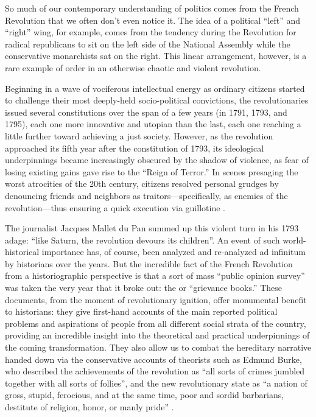So much of our contemporary understanding of politics comes from the French Revolution that we often don't even notice it. The idea of a political ``left'' and ``right'' wing, for example, comes from the tendency during the Revolution for radical republicans to sit on the left side of the National Assembly while the conservative monarchists sat on the right. This linear arrangement, however, is a rare example of order in an otherwise chaotic and violent revolution.

Beginning in a wave of vociferous intellectual energy as ordinary citizens started to challenge their most deeply-held socio-political convictions, the revolutionaries issued several constitutions over the span of a few years (in 1791, 1793, and 1795), each one more innovative and utopian than the last, each one reaching a little further toward achieving a just society. However, as the revolution approached its fifth year after the constitution of 1793, its ideological underpinnings became increasingly obscured by the shadow of violence, as fear of losing existing gains gave rise to the ``Reign of Terror.'' In scenes presaging the worst atrocities of the 20th century, citizens resolved personal grudges by denouncing friends and neighbors as traitors---specifically, as enemies of the revolution---thus ensuring a quick execution via guillotine \citep{furet_interpreting_1978}.

The journalist Jacques Mallet du Pan summed up this violent turn in his 1793 adage: ``like Saturn, the revolution devours its children''. An event of such world-historical importance has, of course, been analyzed and re-analyzed ad infinitum by historians over the years. But the incredible fact of the French Revolution from a historiographic perspective is that a sort of mass ``public opinion survey'' was taken the very year that it broke out: the \cahiers{} or ``grievance books.'' These documents, from the moment of revolutionary ignition, offer monumental benefit to historians: they give first-hand accounts of the main reported political problems and aspirations of people from all different social strata of the country, providing an incredible insight into the theoretical and practical underpinnings of the coming transformation. They also allow us to combat the hereditary narrative handed down via the conservative accounts of theorists such as Edmund Burke, who described the achievements of the revolution as ``all sorts of crimes jumbled together with all sorts of follies'', and the new revolutionary state as ``a nation of gross, stupid, ferocious, and at the same time, poor and sordid barbarians, destitute of religion, honor, or manly pride'' \citep{burke_reflections_1790}.

